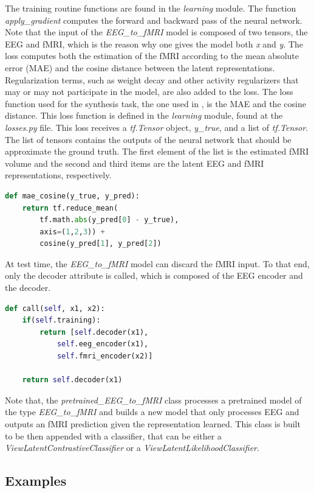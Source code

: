The training routine functions are found in the \textit{learning} module. The function \textit{apply\_gradient} computes the forward and backward pass of the neural network. Note that the input of the \textit{EEG\_to\_fMRI} model is composed of two tensors, the EEG and fMRI, which is the reason why one gives the model both \textit{x} and \textit{y}. The loss computes both the estimation of the fMRI according to the mean absolute error (MAE) and the cosine distance between the latent representations. Regularization terms, such as weight decay and other activity regularizers that may or may not participate in the model, are also added to the loss. The loss function used for the synthesis task, the one used in \cite{calhas2022eeg}, is the MAE and the cosine distance. This loss function is defined in the \textit{learning} module, found at the \textit{losses.py} file. This loss receives a \textit{tf.Tensor} object, \textit{y\_true}, and a list of \textit{tf.Tensor}. The list of tensors contains the outputs of the neural network that should be approximate the ground truth. The first element of the list is the estimated fMRI volume and the second and third items are the latent EEG and fMRI representations, respectively.
\begin{lstlisting}[language=python]
def mae_cosine(y_true, y_pred):
    return tf.reduce_mean(
        tf.math.abs(y_pred[0] - y_true),
        axis=(1,2,3)) +
        cosine(y_pred[1], y_pred[2])
\end{lstlisting}
At test time, the \textit{EEG\_to\_fMRI} model can discard the fMRI input. To that end, only the decoder attribute is called, which is composed of the EEG encoder and the decoder.
\begin{lstlisting}[language=python]
def call(self, x1, x2):
    if(self.training):
        return [self.decoder(x1),
            self.eeg_encoder(x1),
            self.fmri_encoder(x2)]

    return self.decoder(x1)
\end{lstlisting}
Note that, the \textit{pretrained\_EEG\_to\_fMRI} class processes a pretrained model of the type \textit{EEG\_to\_fMRI} and builds a new model that only processes EEG and outputs an fMRI prediction given the representation learned. This class is built to be then appended with a classifier, that can be either a \textit{ViewLatentContrastiveClassifier} or a \textit{ViewLatentLikelihoodClassifier}.

\subsection{Examples}\label{section:examples}

